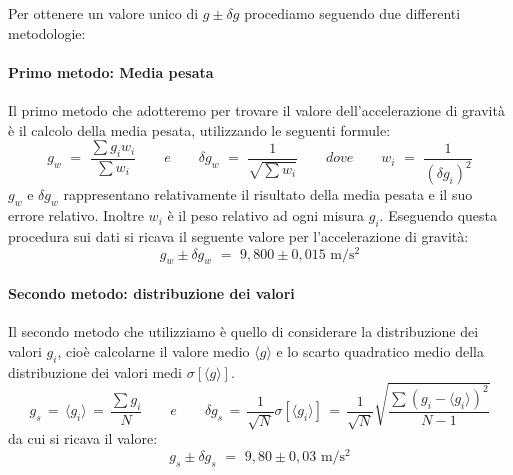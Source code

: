Per ottenere un valore unico di $g \pm \delta g$ procediamo seguendo due differenti metodologie:

\paragraph{Primo metodo: Media pesata\\}

Il primo metodo che adotteremo per trovare il valore dell'accelerazione di gravità è il calcolo della media pesata, utilizzando le seguenti formule:
\begin{equation}
	g_w \,\, = \,\, \frac{\sum g_iw_i}{\sum w_i} \quad\quad e \quad\quad \delta g_w \,\, = \,\, \frac{1}{\sqrt{\sum w_i}} \quad\quad dove \quad\quad w_i \,\, = \,\, \frac{1}{(\delta g_i)^2}
\end{equation}
%
$g_w$ e $\delta g_w$ rappresentano relativamente il risultato della media pesata e il suo errore relativo. Inoltre $w_i$ è il peso relativo ad ogni misura $g_i$.
Eseguendo questa procedura sui dati si ricava il seguente valore per l'accelerazione di gravità:
\begin{equation}
	g_w \pm \delta g_w \,\, = \,\, 9,800 \pm 0,015 \,\, \si{\metre\per\square\second}
\end{equation}

\paragraph{Secondo metodo: distribuzione dei valori\\}

Il secondo metodo che utilizziamo è quello di considerare la distribuzione dei valori $g_i$, cioè calcolarne il valore medio $\langle g\rangle$ e lo scarto quadratico medio della distribuzione dei valori medi $\sigma[\langle g \rangle]$.
\begin{equation}
	g_s \, = \, \langle g_i \rangle \, = \, \frac{\sum g_i}{N} \quad\quad 	e	\quad\quad	\delta g_s \, = \, \frac{1}{\sqrt{N}}\sigma[\langle g_i \rangle] \, = \, \frac{1}{\sqrt{N}}\sqrt{\frac{\sum (g_i - \langle g_i \rangle)^2}{N-1}}
\end{equation}
%
da cui si ricava il valore:
\begin{equation}
	g_s \pm \delta g_s \,\, = \,\, 9,80 \pm 0,03 \,\, \si{\metre\per\square\second}
\end{equation}

